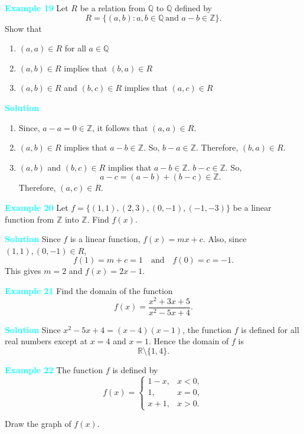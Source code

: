 \documentclass[11pt]{article}
\begin{document}
\noindent\textcolor{cyan}{\textbf{Example 19}}
Let $R$ be a relation from $\mathbb{Q}$ to $\mathbb{Q}$ defined by
\[
R=\{(a,b): a,b\in\mathbb{Q}\ \text{and } a-b\in\mathbb{Z}\}.
\]
Show that
\begin{enumerate}
\item $(a,a)\in R$ for all $a\in\mathbb{Q}$
\item $(a,b)\in R$ implies that $(b,a)\in R$
\item $(a,b)\in R$ and $(b,c)\in R$ implies that $(a,c)\in R$
\end{enumerate}

\noindent\textcolor{cyan}{\textbf{Solution}}
\begin{enumerate}
\item Since, $a-a=0\in\mathbb{Z}$, it follows that $(a,a)\in R$.
\item $(a,b)\in R$ implies that $a-b\in\mathbb{Z}$. So, $b-a\in\mathbb{Z}$.
Therefore, $(b,a)\in R$.
\item $(a,b)$ and $(b,c)\in R$ implies that $a-b\in\mathbb{Z}$.
$b-c\in\mathbb{Z}$. So,
\[
a-c=(a-b)+(b-c)\in\mathbb{Z}.
\]
Therefore, $(a,c)\in R$.
\end{enumerate}

\medskip
\noindent\textcolor{cyan}{\textbf{Example 20}}
Let $f=\{(1,1),(2,3),(0,-1),(-1,-3)\}$ be a linear function from
$\mathbb{Z}$ into $\mathbb{Z}$. Find $f(x)$.

\noindent\textcolor{cyan}{\textbf{Solution}}
Since $f$ is a linear function, $f(x)=mx+c$.
Also, since $(1,1),(0,-1)\in R$,
\[
f(1)=m+c=1 \quad \text{and} \quad f(0)=c=-1.
\]
This gives $m=2$ and $f(x)=2x-1$.

\medskip
\noindent\textcolor{cyan}{\textbf{Example 21}}
Find the domain of the function
\[
f(x)=\frac{x^{2}+3x+5}{x^{2}-5x+4}.
\]

\noindent\textcolor{cyan}{\textbf{Solution}}
Since $x^{2}-5x+4=(x-4)(x-1)$, the function $f$ is defined for all real
numbers except at $x=4$ and $x=1$.
Hence the domain of $f$ is
\[
\mathbb{R}\setminus\{1,4\}.
\]


\noindent\textcolor{cyan}{\textbf{Example 22}}  
The function $f$ is defined by
\[
f(x)=
\begin{cases}
1-x, & x<0,\\[4pt]
1, & x=0,\\[4pt]
x+1, & x>0.
\end{cases}
\]

Draw the graph of $f(x)$.

\vspace{0.5em}
\end{document}

